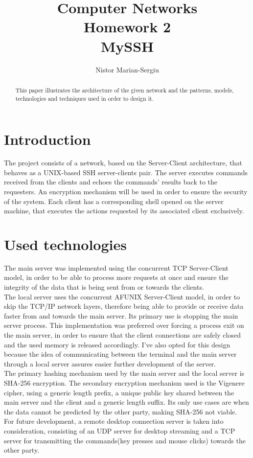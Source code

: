 \documentclass[runningheads]{llncs}
\begin{document}
\title{Computer Networks\\ Homework 2\\ MySSH}
\author{Nistor Marian-Sergiu}

\maketitle

\begin{abstract}
This paper illustrates the architecture of the given network and the patterns, models, technologies and techniques used in order to design it.

\end{abstract}

\section{Introduction}
The project consists of a network, based on the Server-Client architecture, that behaves as a UNIX-based SSH server-clients pair. The server executes commands received from the clients and echoes the commands' results back to the requesters. An encryption mechanism will be used in order to ensure the security of the system. Each client has a corresponding shell opened on the server machine, that executes the actions requested by its associated client exclusively.

\section{Used technologies}
The main server was implemented using the concurrent TCP Server-Client model, in order to be able to process more requests at once and ensure the integrity of the data that is being sent from or towards the clients.\\
The local server uses the concurrent AF\textunderscore UNIX Server-Client model, in order to skip the TCP/IP network layers, therefore being able to provide or receive data faster from and towards the main server. Its primary use is stopping the main server process. This implementation was preferred over forcing a process exit on the main server, in order to ensure that the client connections are safely closed and the used memory is released accordingly. I've also opted for this design because the idea of communicating between the terminal and the main server through a local server assures easier further development of the server.\\
The primary hashing mechanism used by the main server and the local server is SHA-256 encryption. The secondary encryption mechanism used is the Vigenere cipher, using a generic length prefix, a unique public key shared between the main server and the client and a generic length suffix. Its only use cases are when the data cannot be predicted by the other party, making SHA-256 not viable.\\
For future development, a remote desktop connection server is taken into consideration, consisting of an UDP server for desktop streaming and a TCP server for transmitting the commands(key presses and mouse clicks) towards the other party.
\end{document}
